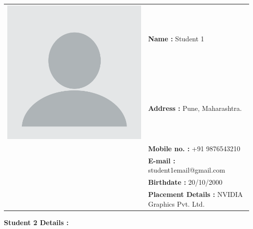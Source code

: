 \documentclass{report} %
\begin{document}
\begin{appendices}
		\centering
		\begin{tabular}{ll}
			\multirow{2}{*}{\includegraphics[scale=0.05]{images/student1.jpg}} & \textbf{Name :} Student 1 \\
			& \textbf{Address :} Pune, Maharashtra.  \\
			& \textbf{Mobile no. :} +91 9876543210  \\
			& \textbf{E-mail :} student1email@gmail.com  \\
			& \textbf{Birthdate :} 20/10/2000  \\
			& \textbf{Placement Details :} NVIDIA Graphics Pvt. Ltd.  \\
		\end{tabular}
		
		\flushleft
		\textbf{Student 2 Details :}
		\vspace{0.5cm}
		

\end{appendices}
\end{document}

